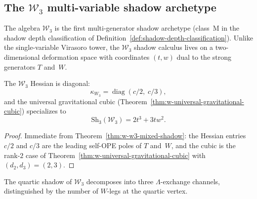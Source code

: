 \subsection{The \texorpdfstring{$\mathcal{W}_3$}{W3} multi-variable shadow archetype}
\label{subsec:w3-shadow-archetype}

The algebra $\mathcal{W}_3$ is the first multi-generator shadow archetype
(class~M in the shadow depth classification of
Definition~\ref{def:shadow-depth-classification}).  Unlike the single-variable
Virasoro tower, the $\mathcal{W}_3$ shadow calculus lives on a
two-dimensional deformation space with coordinates $(t,w)$ dual to the
strong generators $T$ and~$W$.

\begin{proposition}
\label{prop:w3-two-dim-hessian-cubic}
The $\mathcal{W}_3$ Hessian is diagonal:
\begin{equation}
\label{eq:w3-two-dim-hessian}
\kappa_{W_3} = \operatorname{diag}(c/2,\;c/3),
\end{equation}
and the universal gravitational cubic
\textup{(}Theorem~\textup{\ref{thm:w-universal-gravitational-cubic})}
specializes to
\begin{equation}
\label{eq:w3-gravitational-cubic}
\mathrm{Sh}_3(\mathcal{W}_3) = 2t^3 + 3tw^2.
\end{equation}
\end{proposition}

\begin{proof}
Immediate from Theorem~\ref{thm:w-w3-mixed-shadow}: the Hessian
entries $c/2$ and $c/3$ are the leading self-OPE poles of $T$ and~$W$,
and the cubic is the rank-$2$ case of
Theorem~\ref{thm:w-universal-gravitational-cubic} with
$(d_2,d_3) = (2,3)$.
\end{proof}

The quartic shadow of $\mathcal{W}_3$ decomposes into three
$\Lambda$-exchange channels, distinguished by the number of
$W$-legs at the quartic vertex.

